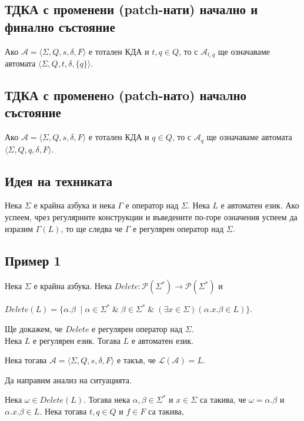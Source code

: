 \documentclass[12pt]{article}
\begin{document}
\subsection*{ТДКА с променени (patch-нати) начално и финално състояние }
Ако \(\mathcal{A} = \langle \Sigma, Q, s, \delta, F \rangle\) е тотален КДА и \(t, q \in Q\), то с \(\mathcal{A}_{t, q}\) ще означаваме автомата \(\langle \Sigma, Q, t, \delta, \{q\} \rangle\).

\subsection*{ТДКА с промененo (patch-натo) начaлно състояние }

Ако \(\mathcal{A} = \langle \Sigma, Q, s, \delta, F \rangle\) е тотален КДА и \(q \in Q\), то с \(\mathcal{A}_q\) ще означаваме автомата \(\langle \Sigma, Q, q, \delta, F \rangle\).

\subsection*{Идея на техниката}
Нека \(\Sigma\) е крайна азбука и нека \(\Gamma\) е оператор над \(\Sigma\).
Нека \(L\) е автоматен език. Ако успеем, чрез регулярните конструкции и въведените по-горе означения успеем да изразим \(\Gamma(L)\), то ще следва че \(\Gamma\) е регулярен оператор над \(\Sigma\).

\subsection*{Пример 1}
Нека \(\Sigma\) е крайна азбука.
Нека \(Delete : \mathcal{P}(\Sigma^*) \to \mathcal{P}(\Sigma^*)\) и

\(Delete(L) = \{\alpha.\beta \;\mid \alpha \in \Sigma^* \;\&\; \beta \in \Sigma^* \;\&\;  (\exists x \in \Sigma)(\alpha.x.\beta \in L)\}\).

Ще докажем, че \(Delete\) е регулярен оператор над \(\Sigma\). \\

Нека \(L\) е регулярен език. Тогава \(L\) е автоматен език.

Нека тогава \(\mathcal{A} = \langle \Sigma, Q, s, \delta, F \rangle\) е такъв, че \(\mathcal{L}(\mathcal{A}) = L\).

Да направим анализ на ситуацията.

Нека \(\omega \in Delete(L)\). Тогава нека \(\alpha, \beta \in \Sigma^*\) и \(x \in \Sigma\) са такива, че \(\omega = \alpha.\beta\) и \(\alpha.x.\beta \in L\). Нека тогава \(t, q \in Q\) и \(f \in F\) са такива,
\end{document}
